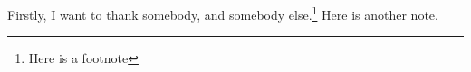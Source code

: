 \begin{acknowledgements}
Firstly, I want to thank somebody, and somebody else.\footnote{Here is a footnote} Here is another note.
\end{acknowledgements}